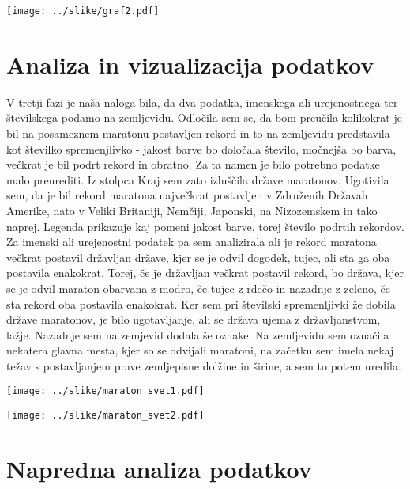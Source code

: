 \documentclass[11pt,a4paper]{article}
\begin{document}
\texttt{[image: ../slike/graf2.pdf]}

\section{Analiza in vizualizacija podatkov}

V tretji fazi je naša naloga bila, da dva podatka, imenskega ali urejenostnega ter številskega podamo na zemljevidu. 
Odločila sem se, da bom preučila kolikokrat je bil na posameznem maratonu postavljen rekord in to na zemljevidu predstavila kot številko spremenjlivko - jakost barve bo določala število, močnejša bo barva, večkrat je bil podrt rekord in obratno. Za ta namen je bilo potrebno podatke malo preurediti. Iz stolpca Kraj sem zato izluščila države maratonov. Ugotivila sem, da je bil rekord maratona največkrat postavljen v Združenih Državah Amerike, nato v Veliki Britaniji, Nemčiji, Japonski, na Nizozemskem in tako naprej. Legenda prikazuje kaj pomeni jakost barve, torej število podrtih rekordov.
Za imenski ali urejenostni podatek pa sem analizirala ali je rekord maratona večkrat postavil državljan države, kjer se je odvil dogodek, tujec, ali sta ga oba postavila enakokrat. Torej, če je državljan večkrat postavil rekord, bo država, kjer se je odvil maraton obarvana z modro, če tujec z rdečo in nazadnje z zeleno, če sta rekord oba postavila enakokrat.
Ker sem pri številski spremenljivki že dobila države maratonov, je bilo ugotavljanje, ali se država ujema z državljanstvom, lažje.
Nazadnje sem na zemjevid dodala še oznake. Na zemljevidu sem označila nekatera glavna mesta, kjer so se odvijali maratoni, na začetku sem imela nekaj težav s postavljanjem prave zemljepisne dolžine in širine, a sem to potem uredila.


\texttt{[image: ../slike/maraton\_svet1.pdf]}

\texttt{[image: ../slike/maraton\_svet2.pdf]}

\section{Napredna analiza podatkov}

\end{document}
